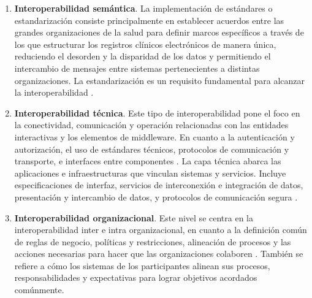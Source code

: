 \begin{enumerate}[label=\alph*.]

    \item \textbf{Interoperabilidad semántica}. La implementación de estándares o estandarización consiste principalmente en establecer acuerdos entre las grandes organizaciones de la salud para definir marcos específicos a través de los que estructurar los registros clínicos electrónicos de manera única, reduciendo el desorden y la disparidad de los datos y permitiendo el intercambio de mensajes entre sistemas pertenecientes a distintas organizaciones. La estandarización es un requisito fundamental para alcanzar la interoperabilidad \cite{katehakis2019framework}. 

    \item \textbf{Interoperabilidad técnica}. Este tipo de interoperabilidad pone el foco en la conectividad, comunicación y operación relacionadas con las entidades interactivas y los elementos de middleware. En cuanto a la autenticación y autorización, el uso de estándares técnicos, protocolos de comunicación y transporte, e interfaces entre componentes \cite{santos2021interoperability}. La capa técnica abarca las aplicaciones e infraestructuras que vinculan sistemas y servicios. Incluye especificaciones de interfaz, servicios de interconexión e integración de datos, presentación y intercambio de datos, y protocolos de comunicación segura \cite{leal2019interoperability}.
    
    \item \textbf{Interoperabilidad organizacional}. Este nivel se centra en la interoperabilidad inter e intra organizacional, en cuanto a la definición común de reglas de negocio, políticas y restricciones, alineación de procesos y las acciones necesarias para hacer que las organizaciones colaboren \cite{motta2019conceptual}. También se refiere a cómo los sistemas de los participantes alinean sus procesos, responsabilidades y expectativas para lograr objetivos acordados comúnmente.

\end{enumerate}

